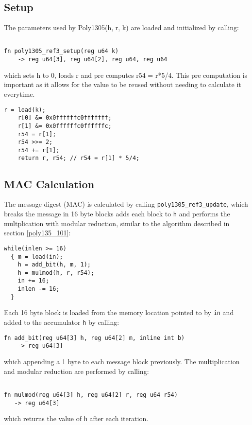 \documentclass{article}
\begin{document}
\subsection{Setup}
The parameters used by Poly1305(h, r, k) are loaded and initialized by calling:
\begin{Verbatim}[fontsize=\footnotesize]

fn poly1305_ref3_setup(reg u64 k) 
    -> reg u64[3], reg u64[2], reg u64, reg u64

\end{Verbatim}

which sets h to 0, loads r and pre computes r54 = r*5/4. This pre computation is important as it allows for the value to be reused without needing to calculate 
it everytime.
\begin{Verbatim}[fontsize=\footnotesize]
    r = load(k);
    r[0] &= 0x0ffffffc0fffffff;
    r[1] &= 0x0ffffffc0ffffffc;
    r54 = r[1];
    r54 >>= 2;
    r54 += r[1];
    return r, r54; // r54 = r[1] * 5/4;
\end{Verbatim}

\subsection{MAC Calculation}
The message digest (MAC) is calculated by calling \texttt{poly1305\_ref3\_update}, which breaks the message in 16 byte blocks adds each block to \texttt{h} 
and performs the multplication with modular reduction, similar to the algorithm described in section \ref{poly135_101}:
\begin{Verbatim}[fontsize=\footnotesize]
while(inlen >= 16)
  { m = load(in);
    h = add_bit(h, m, 1);
    h = mulmod(h, r, r54);
    in += 16;
    inlen -= 16;
  }
\end{Verbatim}

Each 16 byte block is loaded from the memory location pointed to by \texttt{in} and added to the accumulator \texttt{h} by calling:
\begin{Verbatim}[fontsize=\footnotesize]
fn add_bit(reg u64[3] h, reg u64[2] m, inline int b) 
    -> reg u64[3]
\end{Verbatim}

which appending a 1 byte to each message block previously. The multiplication and modular reduction are performed by calling:
\begin{Verbatim}[fontsize=\footnotesize]

fn mulmod(reg u64[3] h, reg u64[2] r, reg u64 r54) 
   -> reg u64[3]

\end{Verbatim}
which returns the value of \texttt{h} after each iteration.
\end{document}

